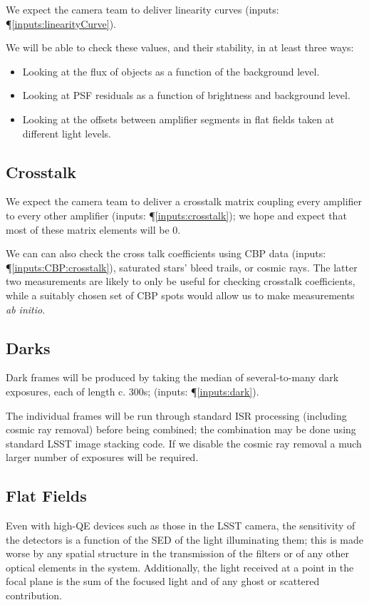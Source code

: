 \documentclass[12pt]{article}
\newcommand{\inputData}[1]{(inputs: \P \ref{inputs:#1})}
\begin{document}
We expect the camera team to deliver linearity curves \inputData{linearityCurve}.

We will be able to check these values, and their stability, in at least three ways:
\begin{itemize}
\item Looking at the flux of objects as a function of the background level.
\item Looking at PSF residuals as a function of brightness and background level.
\item Looking at the offsets between amplifier segments in flat fields taken at different light levels.
\end{itemize}

\subsection{Crosstalk}
\label{sec:crosstalk}

We expect the camera team to deliver a crosstalk matrix coupling every amplifier to every other amplifier
\inputData{crosstalk}; we hope and expect that most of these matrix elements will be 0.

We can can also check the cross talk coefficients using CBP data \inputData{CBP:crosstalk}, saturated
stars' bleed trails, or cosmic rays.  The latter two measurements are likely to only be useful for
checking crosstalk coefficients, while a suitably chosen set of CBP spots would allow us to make
measurements \textit{ab initio}.

\subsection{Darks}

Dark frames will be produced by taking the median of several-to-many dark exposures, each of length c. 300s;
\inputData{dark}.

The individual frames will be run through standard ISR processing (including cosmic ray removal) before
being combined;  the combination may be done using standard LSST image stacking code.  If we disable the
cosmic ray removal a much larger number of exposures will be required.

\subsection{Flat Fields}

Even with high-QE devices such as those in the LSST camera, the sensitivity of the detectors is a function of
the SED of the light illuminating them; this is made worse by any spatial structure in the transmission of the
filters or of any other optical elements in the system.  Additionally, the light received at a point in the
focal plane is the sum of the focused light and of any ghost or scattered contribution.
\end{document}
